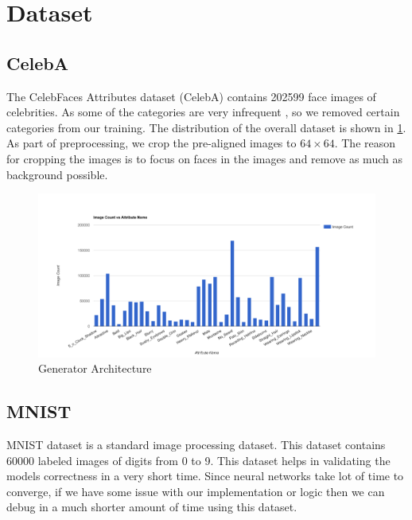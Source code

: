 \section{Dataset}
\subsection{CelebA}
The CelebFaces Attributes dataset (CelebA) \cite{celeba} contains 202599 face images of celebrities. As some of the categories are very infrequent , so we removed certain categories from our training. The distribution of the overall dataset is shown in \cref{fig:celeba}. As part of preprocessing, we crop the pre-aligned images to $64 \times 64$. The reason for cropping the images is to focus on faces in the images and remove as much as background possible.


\begin{figure}[H]
  \centering
    \includegraphics[scale=.3, angle=0]{Files/celeba-visualize.png}
    \caption[Generator Architecture]{Generator Architecture\cite{DCGAN}}
    \label{fig:celeba}
\end{figure}

\subsection{MNIST}
MNIST \cite{MNIST} dataset is a standard image processing dataset. This dataset contains 60000 labeled images of digits from 0 to 9. This dataset helps in validating the models correctness in a very short time. Since neural  networks take lot of time to converge, if we have some issue with our implementation or logic then we can debug in a much shorter amount of time using this dataset.

